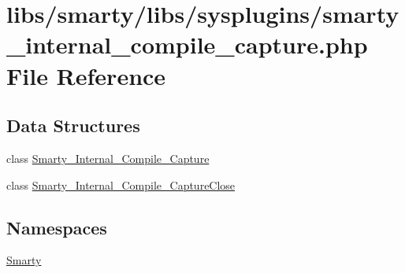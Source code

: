 \hypertarget{smarty__internal__compile__capture_8php}{}\section{libs/smarty/libs/sysplugins/smarty\+\_\+internal\+\_\+compile\+\_\+capture.php File Reference}
\label{smarty__internal__compile__capture_8php}
\subsection*{Data Structures}
\begin{DoxyCompactItemize}
\item 
class \hyperlink{class_smarty___internal___compile___capture}{Smarty\+\_\+\+Internal\+\_\+\+Compile\+\_\+\+Capture}
\item 
class \hyperlink{class_smarty___internal___compile___capture_close}{Smarty\+\_\+\+Internal\+\_\+\+Compile\+\_\+\+Capture\+Close}
\end{DoxyCompactItemize}
\subsection*{Namespaces}
\begin{DoxyCompactItemize}
\item 
 \hyperlink{namespace_smarty}{Smarty}
\end{DoxyCompactItemize}
